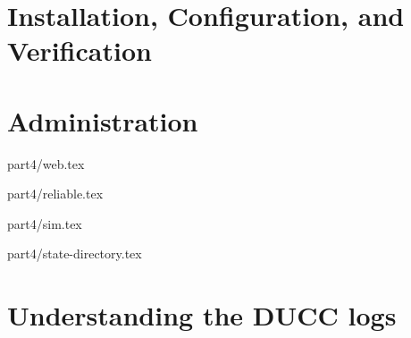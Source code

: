 % 
% 
% 
% 

\ifpdf
\else
{}
\fi
\chapter{Installation, Configuration, and Verification}


\ifpdf
\else
{}
\fi
\chapter{Administration}

















 {part4/web.tex}

 {part4/reliable.tex}

 {part4/sim.tex}

 {part4/state-directory.tex}

\chapter{Understanding the DUCC logs}

